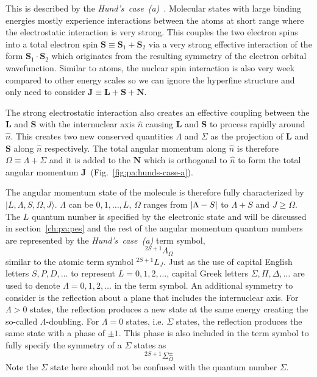 This is described by the \textit{Hund's~case~(a)}~\cite[p.~523-626]{bransden_physics_2003}.
Molecular states with large binding energies mostly experience interactions
between the atoms at short range where the electrostatic interaction is very strong.
This couples the two electron spins into a total electron spin
$\mathbf{S}\equiv\mathbf{S}_1+\mathbf{S}_2$ via a very strong effective interaction
of the form $\mathbf{S}_1\cdot\mathbf{S}_2$ which originates
from the resulting symmetry of the electron orbital wavefunction.
Similar to atoms, the nuclear spin interaction is also very week compared to
other energy scales so we can ignore the hyperfine structure and only need to consider
$\mathbf{J}\equiv\mathbf{L}+\mathbf{S}+\mathbf{N}$.

The strong electrostatic interaction also creates an effective coupling
between the $\mathbf{L}$ and $\mathbf{S}$ with the internuclear axis $\hat{n}$
causing $\mathbf{L}$ and $\mathbf{S}$ to process rapidly around $\hat{n}$.
This creates two new conserved quantities $\Lambda$ and $\Sigma$
as the projection of $\mathbf{L}$ and $\mathbf{S}$
along $\hat{n}$ respectively.
The total angular momentum along $\hat{n}$ is therefore $\Omega\equiv\Lambda+\Sigma$
and it is added to the $\mathbf{N}$ which is orthogonal to $\hat{n}$ to form
the total angular momentum $\mathbf{J}$~(Fig.~\ref{fig:pa:hunds-case-a}).

The angular momentum state of the molecule is therefore fully characterized by
$|L,\Lambda,S,\Omega,J\rangle$. $\Lambda$ can be $0,1,\dots,L$, $\Omega$ ranges from
${\left|{\Lambda-S}\right|}$ to $\Lambda+S$ and $J\geqslant\Omega$.
The $L$ quantum number is specified by the electronic state and will be discussed
in section~\ref{ch:pa:pes} and the rest of the angular momentum quantum numbers
are represented by the \textit{Hund's~case~(a)} term symbol,
\[ ^{2S+1}\Lambda_\Omega \]
similar to the atomic term symbol $^{2S+1}L_J$.
Just as the use of capital English letters $S,P,D,\dots$ to represent
$L=0,1,2,\dots$, capital Greek letters $\Sigma,\Pi,\Delta,\dots$ are used
to denote $\Lambda=0,1,2,\dots$ in the term symbol.
An additional symmetry to consider is the reflection about a plane that includes
the internuclear axis.
For $\Lambda>0$ states, the reflection produces a new state at the same energy
creating the so-called $\Lambda$-doubling. For $\Lambda=0$ states, i.e. $\Sigma$ states,
the reflection produces the same state with a phase of $\pm1$.
This phase is also included in the term symbol to fully specify the symmetry of
a $\Sigma$ states as
\[ ^{2S+1}\Sigma_\Omega^{\pm} \]
Note the $\Sigma$ state here should not be confused with the quantum number $\Sigma$.

